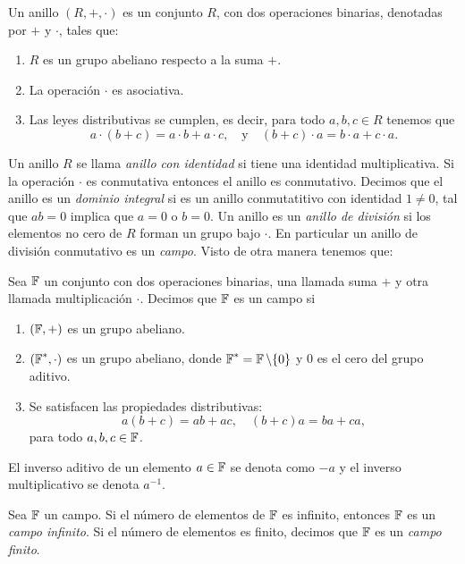 \begin{definition}
  Un anillo $(R,+,\cdot)$ es un conjunto $R$, con dos
  operaciones binarias, denotadas por $+$ y $\cdot$, tales
  que:
  \begin{enumerate}
    \item $R$ es un grupo abeliano respecto a la suma $+$.
    \item La operación $\cdot$ es asociativa.
    \item Las leyes distributivas se cumplen, es decir, para
      todo $a,b,c \in R$ tenemos que
      \[
        a \cdot (b+c) = a \cdot b + a \cdot c,
        \quad
        \text{y}
        \quad
        (b+c) \cdot a = b \cdot a + c \cdot a.
      \] 
  \end{enumerate}
\end{definition}
Un anillo $R$ se llama \textit{anillo con identidad} si
tiene una identidad multiplicativa. Si la operación $\cdot$
es conmutativa entonces el anillo es conmutativo. Decimos
que el anillo es un \textit{dominio integral} si es un
anillo conmutatitivo con identidad $1 \neq 0$, tal que $ab =
0$ implica que $a = 0$ o $b = 0$. Un anillo es un
\textit{anillo de división} si los elementos no cero de $R$
forman un grupo bajo $\cdot$. En particular un anillo de
división conmutativo es un \textit{campo}. Visto de otra
manera tenemos que:
\begin{definition}
  Sea $\operatorname{\mathbb{F}}$ un conjunto con dos operaciones binarias, una
  llamada suma $+$ y otra llamada multiplicación $\cdot$.
  Decimos que $\operatorname{\mathbb{F}}$ es un campo si
  \begin{enumerate}
    \item $(\operatorname{\mathbb{F}},+)$ es un grupo abeliano.
    \item $(\operatorname{\mathbb{F}}^{*},\cdot)$ es un grupo abeliano, donde
      $\operatorname{\mathbb{F}}^{*} = \operatorname{\mathbb{F}} \setminus \{0\}$ y $0$ es el cero del
      grupo aditivo.
    \item Se satisfacen las propiedades distributivas:
      \[
        a(b+c) = ab+ac,
        \quad
        (b+c)a = ba+ca,
      \] 
      para todo $a,b,c \in \operatorname{\mathbb{F}}$.
  \end{enumerate}
\end{definition}
El inverso aditivo de un elemento $a \in \operatorname{\mathbb{F}}$ se denota como
$-a$ y el inverso multiplicativo se denota $a^{-1}$.
\begin{definition}
  Sea $\operatorname{\mathbb{F}}$ un campo. Si el número de elementos de $\operatorname{\mathbb{F}}$ es
  infinito, entonces $\operatorname{\mathbb{F}}$ es un \textit{campo infinito}. Si
  el número de elementos es finito, decimos que $\operatorname{\mathbb{F}}$ es un
  \textit{campo finito}.
\end{definition}

